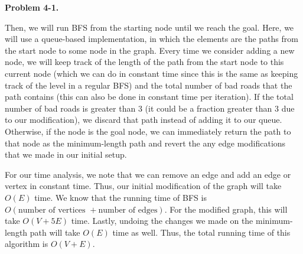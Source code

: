 \documentclass[12pt,oneside]{article}
\newcounter{problemnum}
\newcommand{\theproblem}{Problem \theproblemsetnum-\theproblemnum}
\newenvironment{problems}{
        \begin{list}{{\bf \theproblem. \hspace*{0.5em}}}
        {\setlength{\leftmargin}{0em}
         \setlength{\rightmargin}{0em}
         \setlength{\labelwidth}{0em}
         \setlength{\labelsep}{0em}
         \usecounter{problemnum}}}{\end{list}}
\newcommand{\theproblemsetnum}{4}
\renewcommand{\theproblemnum}{1}
\begin{document}
\begin{problems}
{{Then, we will run BFS from the starting node until we reach the goal. Here, we will use a queue-based implementation, in which the elements are the paths from the start node to some node in the graph. Every time we consider adding a new node, we will keep track of the length of the path from the start node to this current node (which we can do in constant time since this is the same as keeping track of the level in a regular BFS) and the total number of bad roads that the path contains (this can also be done in constant time per iteration). If the total number of bad roads is greater than $3$ (it could be a fraction greater than $3$ due to our modification), we discard that path instead of adding it to our queue. Otherwise, if the node is the goal node, we can immediately return the path to that node as the minimum-length path and revert the any edge modifications that we made in our initial setup.

For our time analysis, we note that we can remove an edge and add an edge or vertex in constant time. Thus, our initial modification of the graph will take $O(E)$ time. We know that the running time of BFS is $O(\text{number of vertices } + \text{number of edges})$. For the modified graph, this will take $O(V+ 5E)$ time. Lastly, undoing the changes we made on the minimum-length path will take $O(E)$ time as well. Thus, the total running time of this algorithm is $O(V+E)$.
}}


\end{problems}
\end{document}
